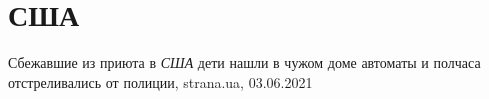  
 
 
 
 
\chapter{США}

Сбежавшие из приюта в \emph{США} дети нашли в чужом доме автоматы и полчаса отстреливались от полиции,
strana.ua, 03.06.2021
